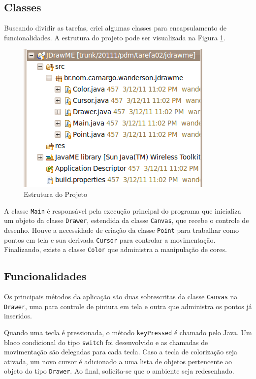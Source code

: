 \documentclass{article}
\begin{document}
\subsection{Classes}

Buscando dividir as tarefas, criei algumas classes para encapsulamento de
funcionalidades. A estrutura do projeto pode ser visualizada na Figura
\ref{fig:projeto}.

\begin{figure}
    \centering{}
    \includegraphics[scale=0.45]{screenshot01-project.png}
    \caption{Estrutura do Projeto}
    \label{fig:projeto}
\end{figure}

A classe \texttt{Main} é responsável pela execução principal do programa que
inicializa um objeto da classe \texttt{Drawer}, estendida da classe
\texttt{Canvas}, que recebe o controle de desenho. Houve a necessidade de
criação da classe \texttt{Point} para trabalhar como pontos em tela e sua
derivada \texttt{Cursor} para controlar a movimentação. Finalizando, existe a
classe \texttt{Color} que administra a manipulação de cores.

\subsection{Funcionalidades}

Os principais métodos da aplicação são duas sobrescritas da classe
\texttt{Canvas} na \texttt{Drawer}, uma para controle de pintura em tela e
outra que administra os pontos já inseridos.

Quando uma tecla é pressionada, o método \texttt{keyPressed} é chamado pelo
Java. Um bloco condicional do tipo \texttt{switch} foi desenvolvido e as
chamadas de movimentação são delegadas para cada tecla. Caso a tecla de
colorização seja ativada, um novo cursor é adicionado a uma lista de objetos
pertencente ao objeto do tipo \texttt{Drawer}. Ao final, solicita-se que o
ambiente seja redesenhado.
\end{document}

